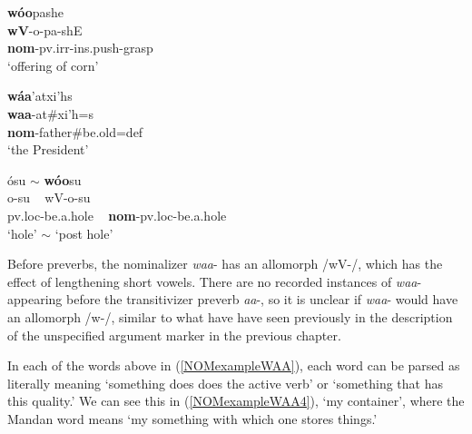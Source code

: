 \begin{exe}
\begin{xlist}
    \item\label{NOMexampleWAA7} \glll \textbf{wóo}pashe\\
    \textbf{wV}-o-pa-shE\\
    \textbf{nom}-pv.irr-ins.push-\textnormal{grasp}\\
    \glt `offering of corn' \citep[229]{hollow1970}
    
    \item\label{NOMexampleWAA8} \glll \textbf{wáa}'atxi'hs\\
    \textbf{waa}-at\#xi'h=s\\
    \textbf{nom}-\textnormal{father}\#\textnormal{be.old}=def\\
    \glt `the President' \citep[317]{hollow1970}
    
    \item\label{NOMexampleWAA9} \glll ósu $\sim$ \textbf{wóo}su\\
    o-su ~ wV-o-su\\
    pv.loc-\textnormal{be.a.hole} ~ \textbf{nom}-pv.loc-\textnormal{be.a.hole}\\
    \glt `hole' $\sim$ `post hole' \citep[131]{hollow1970}
    
    \end{xlist}

\end{exe}

Before preverbs, the nominalizer \textit{waa}- has an allomorph /wV-/, which has the effect of lengthening short vowels. There are no recorded instances of \textit{waa}- appearing before the transitivizer preverb \textit{aa}-, so it is unclear if \textit{waa}- would have an allomorph /w-/, similar to what have have seen previously in the description of the unspecified argument marker in the previous chapter.

In each of the words above in (\ref{NOMexampleWAA}), each word can be parsed as literally meaning `something does does the active verb' or `something that has this quality.' We can see this in (\ref{NOMexampleWAA4}), `my container', where the Mandan word means `my something with which one stores things.'


